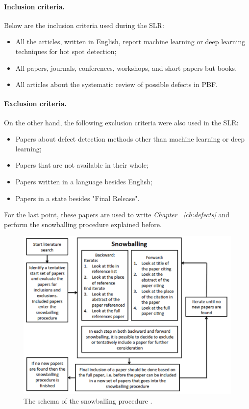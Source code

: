 \paragraph{Inclusion criteria.} Below are the inclusion criteria used during the SLR:
\begin{itemize}
    \item All the articles, written in English, report machine learning or deep learning techniques for  hot spot detection;
    \item All papers, journals, conferences, workshops, and short papers but books.
    \item All articles about the systematic review of possible defects in PBF.
\end{itemize}
\paragraph{Exclusion criteria.} On the other hand, the following exclusion criteria were also used in the SLR:
\begin{itemize}
    \item Papers about defect detection methods other than machine learning or deep learning;
    \item Papers that are not available in their whole;
    \item Papers written in a language besides English;
    \item Papers in a state besides "Final Release".
\end{itemize}

For the last point, these papers are used to write \emph{Chapter ~\ref{ch:defects}} and perform the snowballing procedure explained before.

\begin{figure}
    \centering
    \includegraphics[scale=0.25]{Images/snowballing.png}
    \caption[Snowballing procedure.] {The schema of the snowballing procedure \cite{wohlin_guidelines_2014}.}
    \label{fig:snowballing}
\end{figure}